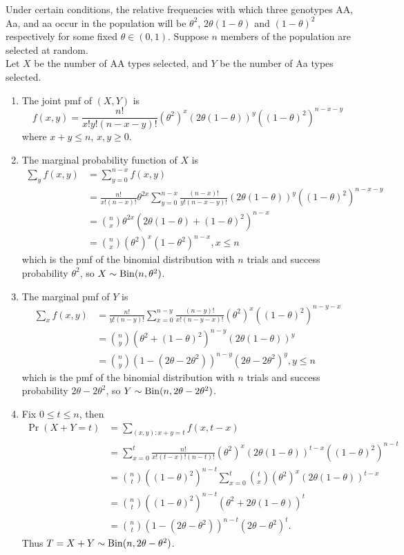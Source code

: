 \documentclass[11pt,fleqn]{book} %
\begin{document}
\begin{example}
\indent Under certain conditions, the relative frequencies with which three genotypes AA, Aa, and aa occur in the population will be \(\theta^2\), \(2\theta(1 - \theta)\) and \((1 - \theta)^2\) respectively for some fixed \(\theta \in (0, 1)\). Suppose \(n\) members of the population are selected at random.\\
\indent Let \(X\) be the number of AA types selected, and \(Y\) be the number of Aa types selected.\\
\begin{enumerate}
\item The joint pmf of \((X, Y)\) is
\[
f(x, y) = \frac{n!}{x!y!(n - x - y)!}(\theta^2)^x(2\theta(1 - \theta))^y((1 - \theta)^2)^{n - x - y}
\]
where \(x + y \leq n\), \(x, y \geq 0\).
\item The marginal probability function of \(X\) is
\[
\begin{aligned}
\sum_y f(x, y) &= \sum_{y=0}^{n - x}f(x, y) \\
&= \frac{n!}{x!(n - x)!}\theta^{2x}\sum_{y=0}^{n-x}\frac{(n-x)!}{y!(n-x-y)!}(2\theta(1 - \theta))^y((1 - \theta)^2)^{n - x - y} \\
&= \binom{n}{x}\theta^{2x}(2\theta(1 - \theta) + (1 - \theta)^2)^{n - x} \\
&= \binom{n}{x}(\theta^2)^x(1 - \theta^2)^{n - x}, x \leq n
\end{aligned}
\]
which is the pmf of the binomial distribution with \(n\) trials and success probability \(\theta^2\), so \(X \sim \operatorname{Bin}(n, \theta^2)\).
\item The marginal pmf of \(Y\) is
\[
\begin{aligned}
\sum_x f(x, y) &= \frac{n!}{y!(n - y)!}\sum_{x=0}^{n-y}\frac{(n-y)!}{x!(n-y-x)!}(\theta^2)^x((1 - \theta)^2)^{n - y - x} \\
&= \binom{n}{y}(\theta^2 + (1 - \theta)^2)^{n - y}(2\theta(1 - \theta))^y \\
&= \binom{n}{y}(1 - (2\theta - 2\theta^2))^{n - y}(2\theta - 2\theta^2)^y, y \leq n
\end{aligned}
\]
which is the pmf of the binomial distribution with \(n\) trials and success probability \(2\theta - 2\theta^2\), so \(Y \sim \operatorname{Bin}(n, 2\theta - 2\theta^2)\). 
\item Fix \(0 \leq t \leq n\), then
\[
\begin{aligned}
\Pr(X + Y = t) &= \sum_{(x, y): x + y = t}f(x, t - x) \\
&= \sum_{x=0}^t \frac{n!}{x!(t - x)!(n - t)!}(\theta^2)^x(2\theta(1 - \theta))^{t - x}((1 - \theta)^2)^{n - t} \\
&= \binom{n}{t}((1 - \theta)^2)^{n - t}\sum_{x=0}^t\binom{t}{x}(\theta^2)^x(2\theta(1 - \theta))^{t - x} \\
&= \binom{n}{t}((1 - \theta)^2)^{n - t}(\theta^2 + 2\theta(1 - \theta))^t \\
&= \binom{n}{t}(1 - (2\theta - \theta^2))^{n - t}(2\theta - \theta^2)^t.
\end{aligned}
\]
\indent Thus \(T = X + Y \sim \operatorname{Bin}(n, 2\theta - \theta^2)\).
\end{enumerate}
\end{example}
\end{document}
